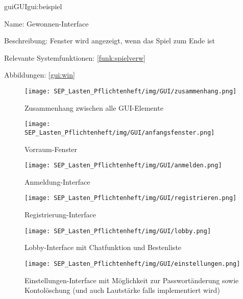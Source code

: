 \begin{description}[leftmargin=5em, style=sameline]	
	\begin{lhp}{gui}{GUI}{gui:beispiel}
		\item[Name:] Gewonnen-Interface
		\item[Beschreibung:] Fenster wird angezeigt, wenn das Spiel zum Ende ist
		\item[Relevante Systemfunktionen:] \ref{funk:spielverw}
		\item[Abbildungen:] \ref{gui:win}
	\end{lhp}
\end{description}

\begin{figure}
	\centering
	\texttt{[image: SEP\_Lasten\_Pflichtenheft/img/GUI/zusammenhang.png]}
	\caption{Zusammenhang zwischen alle GUI-Elemente}
	\label{gui:zsm}
\end{figure}

\begin{figure}
	\centering
	\texttt{[image: SEP\_Lasten\_Pflichtenheft/img/GUI/anfangsfenster.png]}
	\caption{Vorraum-Fenster}
	\label{gui:vorraum}
\end{figure}

\begin{figure}
	\centering
	\texttt{[image: SEP\_Lasten\_Pflichtenheft/img/GUI/anmelden.png]}
	\caption{Anmeldung-Interface}
	\label{gui:anmeldung}
\end{figure}

\begin{figure}
	\centering
	\texttt{[image: SEP\_Lasten\_Pflichtenheft/img/GUI/registrieren.png]}
	\caption{Registrierung-Interface}
	\label{gui:registrieren}
\end{figure}

\begin{figure}
	\centering
	\texttt{[image: SEP\_Lasten\_Pflichtenheft/img/GUI/lobby.png]}
	\caption{Lobby-Interface mit Chatfunktion und Bestenliste}
	\label{gui:lobby}
\end{figure}

\begin{figure}
	\centering
	\texttt{[image: SEP\_Lasten\_Pflichtenheft/img/GUI/einstellungen.png]}
	\caption{Einstellungen-Interface mit Möglichkeit zur Passwortänderung sowie Kontolöschung (und auch Lautstärke falls implementiert wird)}
	\label{gui:einstellung}
\end{figure}

